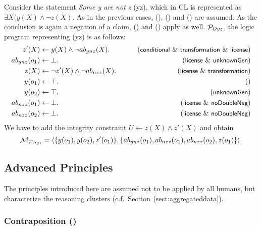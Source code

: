 \documentclass[12pt]{article}
\begin{document}
Consider the statement \textit{Some y are not z} ({\MO yz}), which in CL is represented as $\exists X (y(X) \wedge \neg z(X)$.
As in the previous cases, (\conditionals), (\licenses) and (\unknownGen) are assumed.
As the conclusion is again a negation of a claim, (\transformation) and
(\dnegation) apply as well. ${\cal P}_{Oyz}$, the logic program representing (\MO yz) is as follows:
\begin{align}
z'(X) & \leftarrow y(X) \wedge \neg \Ab_{ynz}(X). & \tag{\conditionals\ \&\ \transformation \ \&\ \licenses} \\
\Ab_{ynz}(o_1) & \leftarrow \bot. & \tag{\licenses\ \& \unknownGen} \\
z(X) & \leftarrow  \neg z'(X) \wedge \neg \Ab_{nzz}(X). &
\tag{\licenses\ \&\ \transformation} \\
y(o_1) & \leftarrow \top. & \tag{} \\
y(o_2) & \leftarrow \top. & \tag{\unknownGen} \\
\Ab_{nzz}(o_1)& \leftarrow \bot. & \tag{\licenses\ \&\ \dnegation}\\
\Ab_{nzz}(o_2)& \leftarrow \bot. & \tag{\licenses\ \&\ \dnegation}
\end{align}
We have to add the integrity constraint $U \leftarrow z(X) \wedge
z'(X)$
and obtain \[{\cal M}_{{\cal P}_{Oyz}} = \langle \{y(o_1), y(o_2), z'(o_1)\},\{ab_{ynz}(o_1),
ab_{nzz}(o_1), ab_{nzz}(o_2), z(o_1) \} \rangle.\]


\subsection{Advanced Principles}\label{sect:advanced}

The principles introduced here are assumed not to be applied by all humans, 
but characterize the reasoning clusters (c.f.\ Section~\ref{sect:aggregateddata}).


\subsubsection{Contraposition (\contraposition)}
\end{document}
